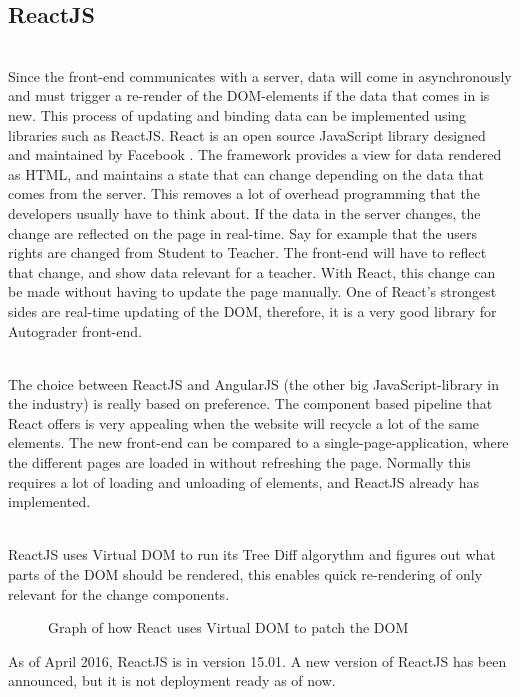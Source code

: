 \subsection{ReactJS}
\\Since the front-end communicates with a server, data will come in asynchronously and must trigger a re-render of the DOM-elements if the data that comes in is new. This process of updating and binding data can be implemented using libraries such as ReactJS. React is an open source JavaScript library designed and maintained by Facebook . The framework provides a view for data rendered as HTML, and maintains a state that can change depending on the data that comes from the server. This removes a lot of overhead programming that the developers usually have to think about. If the data in the server changes, the change are reflected on the page in real-time. Say for example that the users rights are changed from Student to Teacher. The front-end will have to reflect that change, and show data relevant for a teacher. With React, this change can be made without having to update the page manually. One of React's strongest sides are real-time updating of the DOM, therefore, it is a very good library for Autograder front-end. 


\\The choice between ReactJS and AngularJS (the other big JavaScript-library in the industry) is really based on preference. The component based pipeline that React offers is very appealing when the website will recycle a lot of the same elements. The new front-end can be compared to a single-page-application, where the different pages are loaded in without refreshing the page. Normally this requires a lot of loading and unloading of elements, and ReactJS already has implemented. 

\\ReactJS uses Virtual DOM to run its Tree Diff algorythm and figures out what parts of the DOM should be rendered, this enables quick re-rendering of only relevant for the change components.

\begin{figure}[h]
\centering
{}
\caption{Graph of how React uses Virtual DOM to patch the DOM}
\end{figure}

As of April 2016, ReactJS is in version 15.01. A new version of ReactJS has been announced, but it is not deployment ready as of now. 

